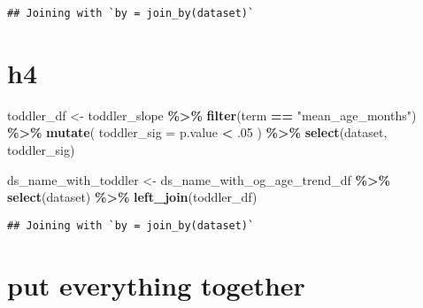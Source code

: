 \documentclass[
]{article}
\newenvironment{Shaded}{\begin{snugshade}}{\end{snugshade}}
\newcommand{\AttributeTok}[1]{\textcolor[rgb]{0.13,0.29,0.53}{#1}}
\newcommand{\DecValTok}[1]{\textcolor[rgb]{0.00,0.00,0.81}{#1}}
\newcommand{\FunctionTok}[1]{\textcolor[rgb]{0.13,0.29,0.53}{\textbf{#1}}}
\newcommand{\NormalTok}[1]{#1}
\newcommand{\OtherTok}[1]{\textcolor[rgb]{0.56,0.35,0.01}{#1}}
\newcommand{\SpecialCharTok}[1]{\textcolor[rgb]{0.81,0.36,0.00}{\textbf{#1}}}
\newcommand{\StringTok}[1]{\textcolor[rgb]{0.31,0.60,0.02}{#1}}
\begin{document}
\begin{verbatim}
## Joining with `by = join_by(dataset)`
\end{verbatim}

\hypertarget{h4}{%
\section{h4}\label{h4}}

\begin{Shaded}
\begin{Highlighting}[]
\NormalTok{toddler\_df }\OtherTok{\textless{}{-}}\NormalTok{ toddler\_slope }\SpecialCharTok{\%\textgreater{}\%} 
  \FunctionTok{filter}\NormalTok{(term }\SpecialCharTok{==} \StringTok{"mean\_age\_months"}\NormalTok{) }\SpecialCharTok{\%\textgreater{}\%}
  \FunctionTok{mutate}\NormalTok{(}
    \AttributeTok{toddler\_sig =}\NormalTok{ p.value }\SpecialCharTok{\textless{}}\NormalTok{ .}\DecValTok{05}
\NormalTok{  ) }\SpecialCharTok{\%\textgreater{}\%} 
  \FunctionTok{select}\NormalTok{(dataset, toddler\_sig)}

\NormalTok{ds\_name\_with\_toddler }\OtherTok{\textless{}{-}}\NormalTok{ ds\_name\_with\_og\_age\_trend\_df }\SpecialCharTok{\%\textgreater{}\%} 
  \FunctionTok{select}\NormalTok{(dataset) }\SpecialCharTok{\%\textgreater{}\%} 
  \FunctionTok{left\_join}\NormalTok{(toddler\_df)}
\end{Highlighting}
\end{Shaded}

\begin{verbatim}
## Joining with `by = join_by(dataset)`
\end{verbatim}

\hypertarget{put-everything-together}{%
\section{put everything together}\label{put-everything-together}}
\end{document}
